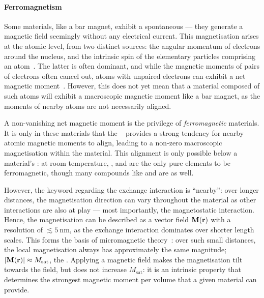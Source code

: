 \paragraph{Ferromagnetism}
Some materials, like a bar magnet, exhibit a spontaneous  --- they generate a magnetic field seemingly without any electrical current.
This magnetisation arises at the atomic level, from two distinct sources: the angular momentum of electrons around the nucleus, and the intrinsic spin of the elementary particles comprising an atom~\cite{coey2010magnetism}.
The latter is often dominant, and while the magnetic moments of pairs of electrons often cancel out, atoms with unpaired electrons can exhibit a net magnetic moment~\cite{PhD_Leliaert}. %
However, this does not yet mean that a material composed of such atoms will exhibit a macroscopic magnetic moment like a bar magnet, as the moments of nearby atoms are not necessarily aligned. \par
A non-vanishing net magnetic moment is the privilege of \textit{ferromagnetic} materials.
It is only in these materials that the ~\cite{heisenberg1928theorie} provides a strong tendency for nearby atomic magnetic moments to align, leading to a non-zero macroscopic magnetisation within the material.
This alignment is only possible below a material's : at room temperature, ,  and  are the only pure elements to be ferromagnetic, though many compounds like  and  are as well. \par
However, the keyword regarding the exchange interaction is ``nearby'': over longer distances, the magnetisation direction can vary throughout the material as other interactions are also at play --- most importantly, the magnetostatic interaction.
Hence, the magnetisation can be described as a vector field $\boldsymbol{\mathbf{M}}(\boldsymbol{\mathbf{r}})$ with a resolution of $\lesssim \SI{5}{\nano\metre}$, as the exchange interaction dominates over shorter length scales.
This forms the basis of micromagnetic theory~\cite{mumax3}: over such small distances, the local magnetisation always has approximately the same magnitude; $|\boldsymbol{\mathbf{M}}(\boldsymbol{\mathbf{r}})| \approx M_\mathrm{sat}$, the .
Applying a magnetic field makes the magnetisation tilt towards the field, but does not increase $M_\mathrm{sat}$: it is an intrinsic property that determines the strongest magnetic moment per volume that a given material can provide.

